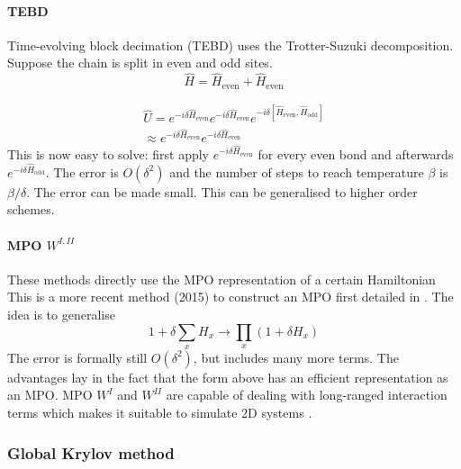 \paragraph{\Gls{TEBD}}
Time-evolving block decimation (\Gls{TEBD})  uses the Trotter-Suzuki decomposition. Suppose the chain is split in even and odd sites.
\begin{equation}
    \hat{H} = \hat{H}_{\text{even}}+\hat{H}_{\text{even}}
\end{equation}

\begin{equation}\label{trotter_exp}
    \begin{split}
        \hat{U} = e^{-i \delta \hat{H}_{\text{even}}}  e^{-i \delta \hat{H}_{\text{even}} }e^{-i \delta \left[ \hat{H}_{\text{even}}, \hat{H}_{\text{odd}} \right] }\\
        \approx e^{-i \delta \hat{H}_{\text{even}}}  e^{-i \delta \hat{H}_{\text{even}} }
    \end{split}
\end{equation}
This is now easy to solve: first apply $e^{-i \delta \hat{H}_{\text{even}}}$ for every even bond and afterwards  $e^{-i \delta \hat{H}_{\text{odd}}}$. The error is $O(\delta^2)$ and the number of steps to reach temperature $\beta$ is $\beta / \delta$. The error can be made small. This can be generalised to higher order schemes.

\paragraph{ \Gls{MPO} $W^{I,II}$}
These methods directly use the \Gls{MPO} representation of a certain Hamiltonian
This is a more recent method (2015) to construct an \Gls{MPO} first detailed in \cite{Zaletel2015}. The idea is to generalise
\begin{equation}
    1+ \delta \sum_x H_x \rightarrow \prod_x (1+  \delta H_x)
\end{equation}
The error is formally still $O(\delta^2)$, but includes many more terms. The advantages lay in the fact that the form above has an efficient representation as an \Gls{MPO}. \Gls{MPO} $W^I$ and $W^{II}$ are capable of dealing with long-ranged interaction terms which makes it suitable to simulate 2D systems \cite{Paeckel2019}.

\subsubsection{Global Krylov method}

